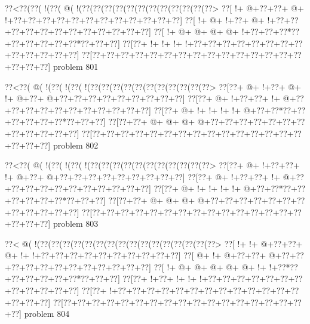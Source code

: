 \vbox{\vbox{\goo
\0??<\0??(\0??(\- !(\0??(\- @(\- !(\0??(\0??(\0??(\0??(\0??(\0??(\0??(\0??(\0??(\0??(\0??(\0??>
\0??[\- !+\- @+\0??+\0??+\- @+\- !+\0??+\0??+\0??+\0??+\0??+\0??+\0??+\0??+\0??+\0??+\0??+\0??]
\0??[\- !+\- @+\- !+\0??+\- @+\- !+\0??+\0??+\0??+\0??+\0??+\0??+\0??+\0??+\0??+\0??+\0??+\0??]
\0??[\- !+\- @+\- @+\- @+\- @+\- !+\0??+\0??+\0??*\0??+\0??+\0??+\0??+\0??+\0??*\0??+\0??+\0??]
\0??[\0??+\- !+\- !+\- !+\- !+\0??+\0??+\0??+\0??+\0??+\0??+\0??+\0??+\0??+\0??+\0??+\0??+\0??]
\0??[\0??+\0??+\0??+\0??+\0??+\0??+\0??+\0??+\0??+\0??+\0??+\0??+\0??+\0??+\0??+\0??+\0??+\0??]
}
\hfil problem 801\hfil\break
}



\vbox{\vbox{\goo
\0??<\0??(\- @(\- !(\0??(\- !(\0??(\- !(\0??(\0??(\0??(\0??(\0??(\0??(\0??(\0??(\0??(\0??(\0??>
\0??[\0??+\- @+\- !+\0??+\- @+\- !+\- @+\0??+\- @+\0??+\0??+\0??+\0??+\0??+\0??+\0??+\0??+\0??]
\0??[\0??+\- @+\- !+\0??+\0??+\- !+\- @+\0??+\0??+\0??+\0??+\0??+\0??+\0??+\0??+\0??+\0??+\0??]
\0??[\0??+\- @+\- !+\- !+\- !+\- !+\- @+\0??+\0??*\0??+\0??+\0??+\0??+\0??+\0??*\0??+\0??+\0??]
\0??[\0??+\0??+\- @+\- @+\- @+\- @+\0??+\0??+\0??+\0??+\0??+\0??+\0??+\0??+\0??+\0??+\0??+\0??]
\0??[\0??+\0??+\0??+\0??+\0??+\0??+\0??+\0??+\0??+\0??+\0??+\0??+\0??+\0??+\0??+\0??+\0??+\0??]
}
\hfil problem 802\hfil\break
}



\vbox{\vbox{\goo
\0??<\0??(\- @(\- !(\0??(\- !(\0??(\- !(\0??(\0??(\0??(\0??(\0??(\0??(\0??(\0??(\0??(\0??(\0??>
\0??[\0??+\- @+\- !+\0??+\0??+\- !+\- @+\0??+\- @+\0??+\0??+\0??+\0??+\0??+\0??+\0??+\0??+\0??]
\0??[\0??+\- @+\- !+\0??+\0??+\- !+\- @+\0??+\0??+\0??+\0??+\0??+\0??+\0??+\0??+\0??+\0??+\0??]
\0??[\0??+\- @+\- !+\- !+\- !+\- !+\- @+\0??+\0??*\0??+\0??+\0??+\0??+\0??+\0??*\0??+\0??+\0??]
\0??[\0??+\0??+\- @+\- @+\- @+\- @+\0??+\0??+\0??+\0??+\0??+\0??+\0??+\0??+\0??+\0??+\0??+\0??]
\0??[\0??+\0??+\0??+\0??+\0??+\0??+\0??+\0??+\0??+\0??+\0??+\0??+\0??+\0??+\0??+\0??+\0??+\0??]
}
\hfil problem 803\hfil\break
}



\vbox{\vbox{\goo
\0??<\- @(\- !(\0??(\0??(\0??(\0??(\0??(\0??(\0??(\0??(\0??(\0??(\0??(\0??(\0??(\0??(\0??(\0??>
\0??[\- !+\- !+\- @+\0??+\0??+\- @+\- !+\- !+\0??+\0??+\0??+\0??+\0??+\0??+\0??+\0??+\0??+\0??]
\0??[\- @+\- !+\- @+\0??+\0??+\- @+\0??+\0??+\0??+\0??+\0??+\0??+\0??+\0??+\0??+\0??+\0??+\0??]
\0??[\- !+\- @+\- @+\- @+\- @+\- @+\- !+\- !+\0??*\0??+\0??+\0??+\0??+\0??+\0??*\0??+\0??+\0??]
\0??[\0??+\- !+\0??+\- !+\- !+\- !+\0??+\0??+\0??+\0??+\0??+\0??+\0??+\0??+\0??+\0??+\0??+\0??]
\0??[\0??+\- !+\0??+\0??+\0??+\0??+\0??+\0??+\0??+\0??+\0??+\0??+\0??+\0??+\0??+\0??+\0??+\0??]
\0??[\0??+\0??+\0??+\0??+\0??+\0??+\0??+\0??+\0??+\0??+\0??+\0??+\0??+\0??+\0??+\0??+\0??+\0??]
}
\hfil problem 804\hfil\break
}



